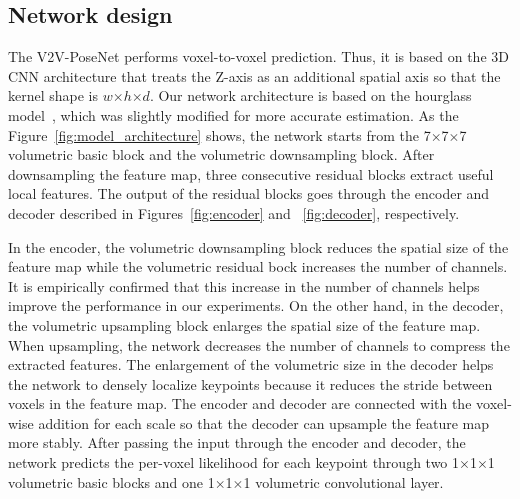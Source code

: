 \subsection{Network design}
The V2V-PoseNet performs voxel-to-voxel prediction. Thus, it is based on the 3D CNN architecture that treats the Z-axis as an additional spatial axis so that the kernel shape is $w$$\times$$h$$\times$$d$. Our network architecture is based on the hourglass model~\cite{newell2016stacked}, which was slightly modified for more accurate estimation. As the Figure~\ref{fig:model_architecture} shows, the network starts from the 7$\times$7$\times$7 volumetric basic block and the volumetric downsampling block. After downsampling the feature map, three consecutive residual blocks extract useful local features. The output of the residual blocks goes through the encoder and decoder described in Figures~\ref{fig:encoder} and ~\ref{fig:decoder}, respectively.

In the encoder, the volumetric downsampling block reduces the spatial size of the feature map while the volumetric residual bock increases the number of channels. It is empirically confirmed that this increase in the number of channels helps improve the performance in our experiments. On the other hand, in the decoder, the volumetric upsampling block enlarges the spatial size of the feature map. When upsampling, the network decreases the number of channels to compress the extracted features. The enlargement of the volumetric size in the decoder helps the network to densely localize keypoints because it reduces the stride between voxels in the feature map. The encoder and decoder are connected with the voxel-wise addition for each scale so that the decoder can upsample the feature map more stably. After passing the input through the encoder and decoder, the network predicts the per-voxel likelihood for each keypoint through two 1$\times$1$\times$1 volumetric basic blocks and one 1$\times$1$\times$1 volumetric convolutional layer.


